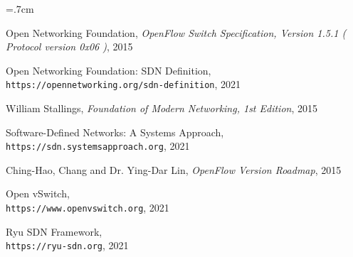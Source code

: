 \renewcommand{\bibname}{مراجع}

\begin{thebibliography}{99}

\begin{latin}

\baselineskip=.7cm

\noindent Open Networking Foundation, \textit{OpenFlow Switch Specification, Version 1.5.1 ( Protocol version 0x06 )}, 2015

\noindent Open Networking Foundation: SDN Definition, \\\texttt{https://opennetworking.org/sdn-definition}, 2021

\noindent William Stallings, \textit{Foundation of Modern Networking, 1st Edition}, 2015

\noindent Software-Defined Networks: A Systems Approach,  \\\texttt{https://sdn.systemsapproach.org}, 2021

\noindent Ching-Hao, Chang and Dr. Ying-Dar Lin, \textit{OpenFlow Version Roadmap}, 2015

\noindent Open vSwitch,
\\\texttt{https://www.openvswitch.org}, 2021

\noindent Ryu SDN Framework,
\\\texttt{https://ryu-sdn.org}, 2021
\end{latin}

\end{thebibliography}